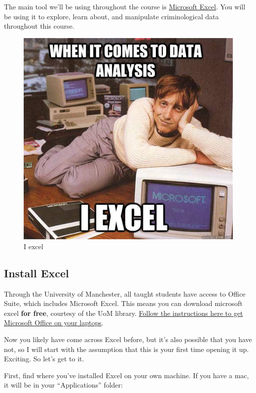 \documentclass[
]{book}
\begin{document}
The main tool we'll be using throughout the course is \href{https://en.wikipedia.org/wiki/Microsoft_Excel}{Microsoft Excel}. You will be using it to explore, learn about, and manipulate criminological data throughout this course.

\begin{figure}
\centering
\includegraphics{imgs/bill_gates_excel.jpg}
\caption{I excel}
\end{figure}

\hypertarget{install-excel}{%
\subsection{Install Excel}\label{install-excel}}

Through the University of Manchester, all taught students have access to Office Suite, which includes Microsoft Excel. This means you can download microsoft excel \textbf{for free}, courtesy of the UoM library. \href{http://www.itservices.manchester.ac.uk/students/office365/}{Follow the instructions here to get Microsoft Office on your laptops}.

Now you likely have come across Excel before, but it's also possible that you have not, so I will start with the assumption that this is your first time opening it up. Exciting. So let's get to it.

First, find where you've installed Excel on your own machine. If you have a mac, it will be in your ``Applications'' folder:
\end{document}
